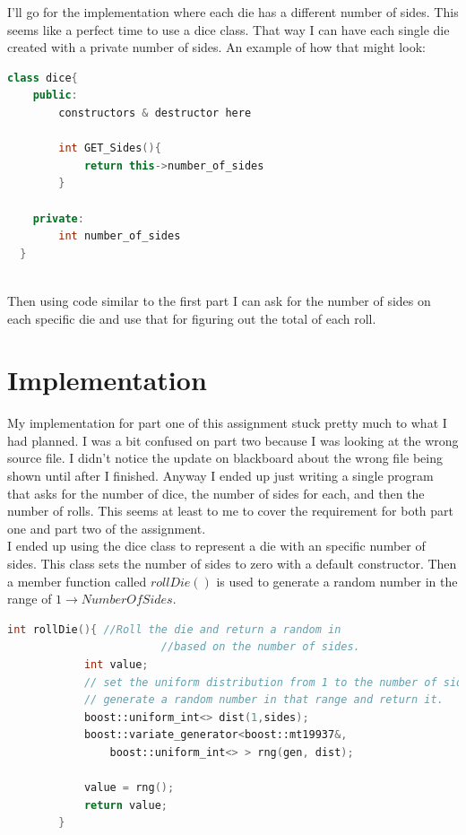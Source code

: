\documentclass[a4paper,12pt]{article}
\begin{document}
I'll go for the implementation where each die has a different number of sides.  This seems like a perfect time to use a dice class.  That way I can have each single die created with a private number of sides.  An example of how that might look:

  \begin{lstlisting}[language=cpp,caption={Dice class}]
  class dice{
  	public:
  		constructors & destructor here
  		
  		int GET_Sides(){
  			return this->number_of_sides
  		}
  		
  	private:
  		int number_of_sides
  }
   
  \end{lstlisting}

Then using code similar to the first part I can ask for the number of sides on each specific die and use that for figuring out the total of each roll. 

\section {Implementation}

My implementation for part one of this assignment stuck pretty much to what I had planned.  I was a bit confused on part two because I was looking at the wrong source file.  I didn't notice the update on blackboard about the wrong file being shown until after I finished.  Anyway I ended up just writing a single program that asks for the number of dice, the number of sides for each, and then the number of rolls.  This seems at least to me to cover the requirement for both part one and part two of the assignment. \\

I ended up using the dice class to represent a die with an specific number of sides.  This class sets the number of sides to zero with a default constructor.  Then a member function called $rollDie()$ is used to generate a random number in the range of $1\rightarrow NumberOfSides$. 

  \begin{lstlisting}[language=cpp,caption={Returning a random int from the dice class}]
          int rollDie(){ //Roll the die and return a random in
          				//based on the number of sides.
            int value;
            // set the uniform distribution from 1 to the number of sides
            // generate a random number in that range and return it.
            boost::uniform_int<> dist(1,sides);
            boost::variate_generator<boost::mt19937&,
                boost::uniform_int<> > rng(gen, dist);

            value = rng();
            return value;
        }
  \end{lstlisting}
\end{document}

